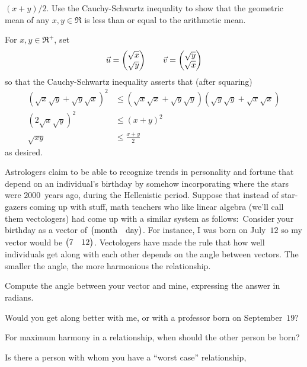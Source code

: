 \begin{exercises}
    \( (x+y)/2 \).
    Use the Cauchy-Schwartz inequality to show that
    the geometric mean of any \( x,y\in\Re \) is less
    than or equal to the arithmetic mean.
    \begin{answer}
      For \( x,y\in\Re^+ \), set
      \begin{equation*}
        \vec{u}=\begin{pmatrix} \sqrt{x} \\ \sqrt{y} \end{pmatrix}
        \qquad
        \vec{v}=\begin{pmatrix} \sqrt{y} \\ \sqrt{x} \end{pmatrix}
      \end{equation*}
      so that the Cauchy-Schwartz inequality asserts that (after squaring)
      \begin{align*}
        (\sqrt{x}\sqrt{y}+\sqrt{y}\sqrt{x})^2
        &\leq(\sqrt{x}\sqrt{x}+\sqrt{y}\sqrt{y})(\sqrt{y}\sqrt{y}
                                              +\sqrt{x}\sqrt{x})   \\
        (2\sqrt{x}\sqrt{y})^2
        &\leq(x+y)^2                            \\
        \sqrt{xy}
        &\leq\frac{x+y}{2}
      \end{align*}
      as desired.  
    \end{answer}
  \puzzle \item 
    Astrologers claim to be able to recognize trends in personality and 
    fortune that depend on an individual’s birthday by somehow incorporating 
    where the stars were $2000$~years ago, during the Hellenistic period.  
    Suppose that instead of star-gazers coming up with stuff, math teachers 
    who like linear algebra (we’ll call them vectologers) had come up with 
    a similar system as follows:~Consider your birthday as a vector of 
    $\begin{pmatrix} \text{month} &\text{day} \end{pmatrix}$.  
    For instance, I was born on July~$12$ so my vector would be 
    $\begin{pmatrix} 7  &12 \end{pmatrix}$.  
    Vectologers have made the rule that how well individuals get along 
    with each other depends on the angle between vectors.  
    The smaller the angle, the more harmonious the relationship.
    \cite{Cleary}
    \begin{exparts}
      \item Compute the angle between your vector and mine, 
        expressing the answer in radians.
      \item Would you get along better with me, 
        or with a professor born on September~$19$?
      \item For maximum harmony in a relationship, 
        when should the other person be born? 
      \item Is there a person with whom you have a ``worst case'' relationship,

\end{exparts}
\end{exercises}
